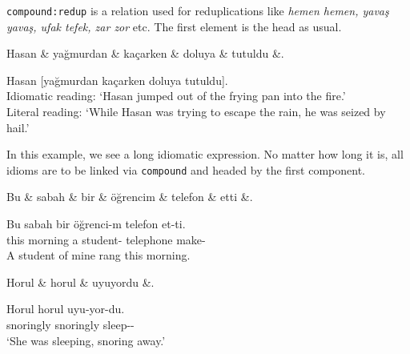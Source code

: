 \documentclass[11pt,a4paper]{article}
\begin{document}
\texttt{compound:redup} is a relation used for reduplications like \textit{hemen hemen, yavaş yavaş, ufak tefek, zar zor} etc. The first element is the head as usual.

\begin{exe}
\ex \label{compound}
\begin{dependency}[column sep=0.28cm]
\begin{deptext}
Hasan \& yağmurdan \& kaçarken \& doluya \& tutuldu \&. \\
\end{deptext}
\end{dependency}
\gll Hasan [yağmurdan kaçarken doluya tutuldu]. \\
Idiomatic reading: ‘Hasan jumped out of the frying pan into the fire.’\\
\glt Literal reading: ‘While Hasan was trying to escape the rain, he was seized by hail.'
\end{exe}

In this example, we see a long idiomatic expression. No matter how long it is, all idioms are to be linked via \texttt{compound} and headed by the first component.

\begin{exe}
\ex \label{compound:lvc}
\begin{dependency}
\begin{deptext}[column sep=0.25cm]
Bu \& sabah \& bir \& öğrencim \& telefon \& etti \&. \\
\end{deptext}
\end{dependency}
\gll Bu sabah bir öğrenci-m telefon et-ti. \\
this morning a student-\Fsg{} telephone make-\Pst{} \\
\glt A student of mine rang this morning.
\end{exe}

\begin{exe}
\ex \label{compound:redup}
\begin{dependency}
\begin{deptext}[column sep=0.25cm]
Horul \& horul \& uyuyordu \&. \\
\end{deptext}
\end{dependency}
\gll Horul horul uyu-yor-du. \\
snoringly snoringly sleep-\Prog{}-\Pst{} \\
\glt ‘She was sleeping, snoring away.’
\end{exe}
\end{document}
